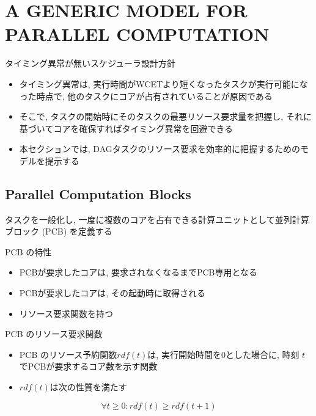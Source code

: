
\section{A GENERIC MODEL FOR PARALLEL COMPUTATION}
\label{sec: A GENERIC MODEL FOR PARALLEL COMPUTATION}

\begin{frame}{タイミング異常が無いスケジューラ設計方針}
    \begin{itemize}
        \item タイミング異常は, 実行時間がWCETより短くなったタスクが実行可能になった時点で, 他のタスクにコアが占有されていることが原因である
        \item そこで, タスクの開始時にそのタスクの最悪リソース要求量を把握し, それに基づいてコアを確保すればタイミング異常を回避できる
        \item 本セクションでは, DAGタスクのリソース要求を効率的に把握するためのモデルを提示する
    \end{itemize}
\end{frame}


\subsection{Parallel Computation Blocks}
\label{ssec: Parallel Computation Blocks}

\begin{frame}{}
    タスクを一般化し, 一度に複数のコアを占有できる計算ユニットとして並列計算ブロック (PCB) を定義する
    \begin{block}{PCB の特性}
        \begin{itemize}
            \item PCBが要求したコアは, 要求されなくなるまでPCB専用となる
            \item PCBが要求したコアは, その起動時に取得される
            \item リソース要求関数を持つ
        \end{itemize}
    \end{block}
\end{frame}

\begin{frame}{PCB のリソース要求関数}
    \begin{definition}
        \setlength{\linewidth}{0.98\columnwidth}
        \begin{itemize}
            \item PCB のリソース予約関数$rdf(t)$は, 実行開始時間を0とした場合に, 時刻 $t$でPCBが要求するコア数を示す関数
            \item $rdf(t)$は次の性質を満たす
        \end{itemize}
        \begin{equation*}
            \forall t \geq 0: rdf(t) \geq rdf(t+1)
        \end{equation*}
    \end{definition}
\end{frame}

